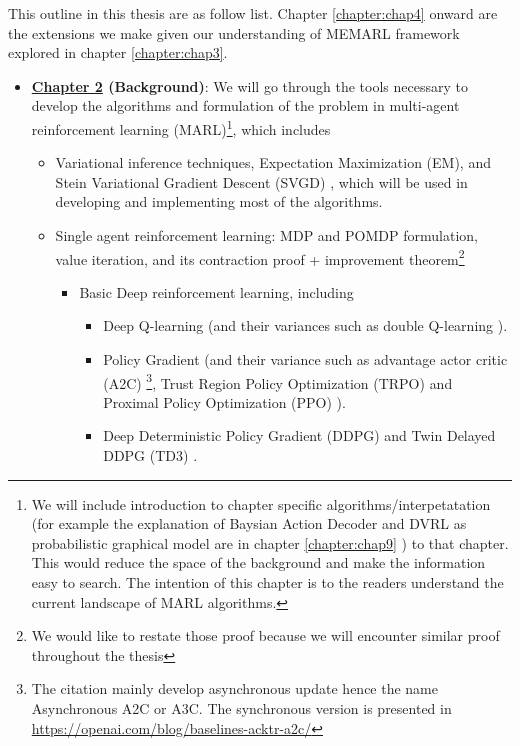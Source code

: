 \label{sec:chap1-Outline}
This outline in this thesis are as follow list. Chapter \ref{chapter:chap4} onward are the extensions we make given our understanding of MEMARL framework explored in chapter \ref{chapter:chap3}.
\begin{itemize}
    \item \textbf{\hyperref[chapter:chap2]{Chapter 2} (Background)}: We will go through the tools necessary to develop the algorithms and formulation of the problem in multi-agent reinforcement learning (MARL)\footnote{We will include introduction to chapter specific algorithms/interpetatation (for example the explanation of Baysian Action Decoder \cite{foerster2018bayesian} and DVRL as probabilistic graphical model \cite{shvechikovjoint} are in chapter \ref{chapter:chap9} ) to that chapter. This would reduce the space of the background and make the information easy to search. The intention of this chapter is to the readers understand the current landscape of MARL algorithms.}, which includes 
    \begin{itemize}
        \item Variational inference techniques, Expectation Maximization (EM), and Stein Variational Gradient Descent (SVGD) \cite{liu2016stein}, which will be used in developing and implementing most of the algorithms.
        \item Single agent reinforcement learning: MDP and POMDP formulation, value iteration, and its contraction proof + improvement theorem\footnote{We would like to restate those proof because we will encounter similar proof throughout the thesis}
        \begin{itemize}
            \item Basic Deep reinforcement learning, including
            \begin{itemize}
                \item  Deep Q-learning \cite{mnih2015human} (and their variances such as double Q-learning \cite{van2016deep}).
                \item Policy Gradient \cite{sutton2000policy} (and their variance such as advantage actor critic (A2C) \cite{mnih2016asynchronous}\footnote{The citation mainly develop asynchronous update hence the name Asynchronous A2C or A3C. The synchronous version is presented in \url{https://openai.com/blog/baselines-acktr-a2c/}}, Trust Region Policy Optimization (TRPO) \cite{schulman2015trust} and Proximal Policy Optimization (PPO) \cite{schulman2017proximal}).
                \item Deep Deterministic Policy Gradient (DDPG) \cite{lillicrap2015continuous} and Twin Delayed DDPG (TD3) \cite{fujimoto2018addressing}.

\end{itemize}
\end{itemize}
\end{itemize}
\end{itemize}
